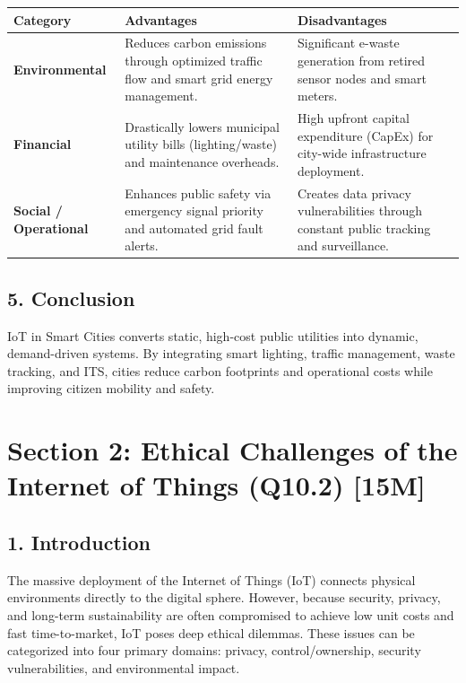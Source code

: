 \begin{table}[H]
\centering
\begin{tabular}{|p{}|p{}|p{}|}
\hline
Category & Advantages & Disadvantages \\
\hline
\textbf{Environmental} & Reduces carbon emissions through optimized traffic flow and smart grid energy management. & Significant e-waste generation from retired sensor nodes and smart meters. \\
\hline
\textbf{Financial} & Drastically lowers municipal utility bills (lighting/waste) and maintenance overheads. & High upfront capital expenditure (CapEx) for city-wide infrastructure deployment. \\
\hline
\textbf{Social / Operational} & Enhances public safety via emergency signal priority and automated grid fault alerts. & Creates data privacy vulnerabilities through constant public tracking and surveillance. \\
\hline
\end{tabular}
\end{table}


\subsection{5. Conclusion}
IoT in Smart Cities converts static, high-cost public utilities into dynamic, demand-driven systems. By integrating smart lighting, traffic management, waste tracking, and ITS, cities reduce carbon footprints and operational costs while improving citizen mobility and safety.



\section{Section 2: Ethical Challenges of the Internet of Things (Q10.2) [15M]}

\subsection{1. Introduction}
The massive deployment of the Internet of Things (IoT) connects physical environments directly to the digital sphere. However, because security, privacy, and long-term sustainability are often compromised to achieve low unit costs and fast time-to-market, IoT poses deep ethical dilemmas. These issues can be categorized into four primary domains: privacy, control/ownership, security vulnerabilities, and environmental impact.

